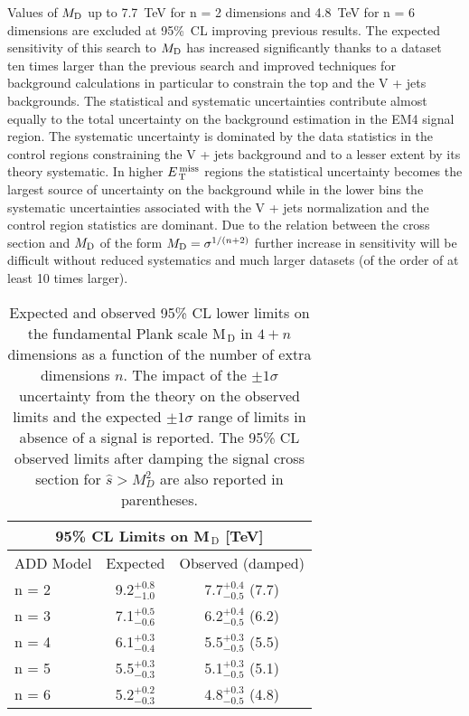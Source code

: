Values of $M_\mathrm{D}$ up to 7.7~TeV for n = 2 dimensions and 4.8~TeV for n = 6
dimensions are excluded at 95\%~CL improving previous results. The expected
sensitivity of this search to $M_\mathrm{D}$ has increased significantly thanks to a
dataset ten times larger than the previous search and improved techniques for
background calculations in particular to constrain the top and the V + jets
backgrounds. The statistical and systematic uncertainties contribute almost
equally to the total uncertainty on the background estimation in the EM4 signal
region. The systematic uncertainty is dominated by the data statistics in the
control regions constraining the V + jets background and to a lesser extent by
its theory systematic. In higher $E_\mathrm{\, T}^\mathrm{\, miss}$ regions the statistical uncertainty
becomes the largest source of uncertainty on the background while in the lower
bins the systematic uncertainties associated with the V + jets normalization and
the control region statistics are dominant. Due to the relation between the
cross section and $M_\mathrm{D}$ of the form $M_\mathrm{D} = \sigma^{1/(n+2)}$ further increase in
sensitivity will be difficult without reduced systematics and much larger
datasets (of the order of at least 10 times larger).
\begin{table}[!htb]
  \centering
  \begin{tabular}{lcc}
    \toprule
    \multicolumn{3}{c}{95\% CL Limits on M$_\mathrm{\, D}$
    [TeV]} \\
    \midrule \midrule
    ADD Model & Expected & Observed (damped) \\
    \midrule
    n = 2 & 9.2$^{+0.8}_{-1.0}$ & 7.7$^{+0.4}_{-0.5}$ (7.7) \B \\
    n = 3 & 7.1$^{+0.5}_{-0.6}$ & 6.2$^{+0.4}_{-0.5}$ (6.2) \T \B \\
    n = 4 & 6.1$^{+0.3}_{-0.4}$ & 5.5$^{+0.3}_{-0.5}$ (5.5) \T \B \\
    n = 5 & 5.5$^{+0.3}_{-0.3}$ & 5.1$^{+0.3}_{-0.5}$ (5.1) \T \B \\
    n = 6 & 5.2$^{+0.2}_{-0.3}$ & 4.8$^{+0.3}_{-0.5}$ (4.8) \T \\
    \bottomrule
  \end{tabular}
  \caption{Expected and observed 95\% CL lower limits on the fundamental Plank
      scale M$_\mathrm{\, D}$ in $4 + n$ dimensions as a function of the number
      of extra dimensions $n$. The impact of the $\pm 1 \sigma$ uncertainty from
      the theory on the observed limits and the expected $\pm 1 \sigma$ range of
      limits in absence of a signal is reported. The 95\% CL observed limits
      after damping the signal cross section for $\hat{s} > M_D^2$ are also
      reported in parentheses.}
  \label{tab:add_limits}
\end{table}
